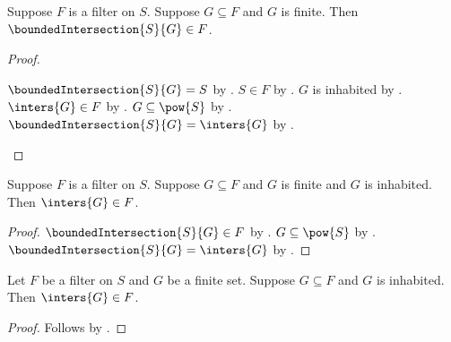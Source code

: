 \begin{theorem}\label{filter_bounded_finite_intersection_in}
    Suppose $F$ is a filter on $S$.
    Suppose $G\subseteq F$ and $G$ is finite.
    Then $\boundedIntersection{S}{G}\in F$.
\end{theorem}
\begin{proof}
    \begin{byCase}
        $\boundedIntersection{S}{G}=S$ by
            .
        $S\in F$ by .
        $G$ is inhabited by .
        $\inters{G}\in F$ by
            .
        $G\subseteq\pow{S}$ by
            .
        $\boundedIntersection{S}{G}=\inters{G}$ by
            .
    \end{byCase}
\end{proof}

\begin{proposition}\label{filter_finite_intersection_in}
    Suppose $F$ is a filter on $S$.
    Suppose $G\subseteq F$ and $G$ is finite and $G$ is inhabited.
    Then $\inters{G}\in F$.
\end{proposition}
\begin{proof}
    $\boundedIntersection{S}{G}\in F$ by
        .
    $G\subseteq\pow{S}$ by
        .
    $\boundedIntersection{S}{G}=\inters{G}$ by
        .
\end{proof}

\begin{theorem}\label{filter_finite_family_intersection}
    Let $F$ be a filter on $S$ and $G$ be a finite set.
    Suppose $G\subseteq F$ and $G$ is inhabited.
    Then $\inters{G}\in F$.
\end{theorem}
\begin{proof}
    Follows by .
\end{proof}

